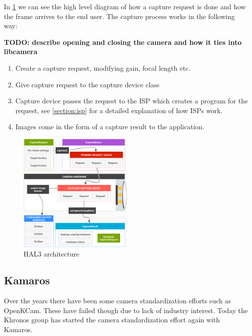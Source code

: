 In \cref{fig:hal3arch} we can see the high level diagram of how a capture
request is done and how the frame arrives to the end user. The capture process
works in the following way:

\textbf{TODO: describe opening and closing the camera and how it ties into libcamera}
\begin{enumerate}
    \item Create a capture request, modifying gain, focal length etc.
    \item Give capture request to the capture device class
    \item Capture device passes the request to the ISP which creates a program
        for the request, see \cref{section:isp} for a detailed explanation of
        how ISPs work.

    \item Images come in the form of a capture result to the application.
\end{enumerate}


\begin{figure}
    \begin{center}
        \includegraphics[width=0.5\textwidth]{figures/hal3arch}
    \end{center}
    \caption{HAL3 architecture~\cite{hal3arch}}\label{fig:hal3arch}
\end{figure}

\subsection{Kamaros}
Over the years there have been some camera standardization efforts such as
OpenKCam. These have failed though due to lack of industry interest. Today
the Khronos group has started the camera standardization effort again with
Kamaros.

